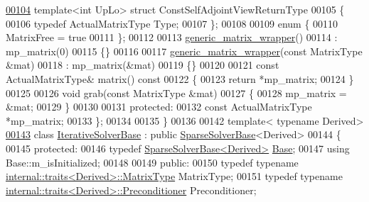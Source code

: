 \begin{DoxyCode}
\hyperlink{struct_eigen_1_1internal_1_1generic__matrix__wrapper_3_01_matrix_type_00_01true_01_4_1_1_const_self_adjoint_view_return_type}{00104}   \textcolor{keyword}{template}<\textcolor{keywordtype}{int} UpLo> \textcolor{keyword}{struct }ConstSelfAdjointViewReturnType
00105   \{
00106     \textcolor{keyword}{typedef} ActualMatrixType Type;
00107   \};
00108 
00109   \textcolor{keyword}{enum} \{
00110     MatrixFree = \textcolor{keyword}{true}
00111   \};
00112 
00113   \hyperlink{class_eigen_1_1internal_1_1generic__matrix__wrapper}{generic\_matrix\_wrapper}()
00114     : mp\_matrix(0)
00115   \{\}
00116 
00117   \hyperlink{class_eigen_1_1internal_1_1generic__matrix__wrapper}{generic\_matrix\_wrapper}(\textcolor{keyword}{const} MatrixType &mat)
00118     : mp\_matrix(&mat)
00119   \{\}
00120 
00121   \textcolor{keyword}{const} ActualMatrixType& matrix()\textcolor{keyword}{ const}
00122 \textcolor{keyword}{  }\{
00123     \textcolor{keywordflow}{return} *mp\_matrix;
00124   \}
00125 
00126   \textcolor{keywordtype}{void} grab(\textcolor{keyword}{const} MatrixType &mat)
00127   \{
00128     mp\_matrix = &mat;
00129   \}
00130 
00131 \textcolor{keyword}{protected}:
00132   \textcolor{keyword}{const} ActualMatrixType *mp\_matrix;
00133 \};
00134 
00135 \}
00136 
00142 \textcolor{keyword}{template}< \textcolor{keyword}{typename} Derived>
\hyperlink{group___iterative_linear_solvers___module}{00143} \textcolor{keyword}{class }\hyperlink{group___iterative_linear_solvers___module_class_eigen_1_1_iterative_solver_base}{IterativeSolverBase} : \textcolor{keyword}{public} \hyperlink{group___sparse_core___module_class_eigen_1_1_sparse_solver_base}{SparseSolverBase}<Derived>
00144 \{
00145 \textcolor{keyword}{protected}:
00146   \textcolor{keyword}{typedef} \hyperlink{group___sparse_core___module_class_eigen_1_1_sparse_solver_base}{SparseSolverBase<Derived>} \hyperlink{group___sparse_core___module_class_eigen_1_1_sparse_solver_base}{Base};
00147   \textcolor{keyword}{using} Base::m\_isInitialized;
00148   
00149 \textcolor{keyword}{public}:
00150   \textcolor{keyword}{typedef} \textcolor{keyword}{typename} \hyperlink{struct_eigen_1_1internal_1_1traits}{internal::traits<Derived>::MatrixType} MatrixType;
00151   \textcolor{keyword}{typedef} \textcolor{keyword}{typename} \hyperlink{struct_eigen_1_1internal_1_1traits}{internal::traits<Derived>::Preconditioner} 
      Preconditioner;

\end{DoxyCode}
